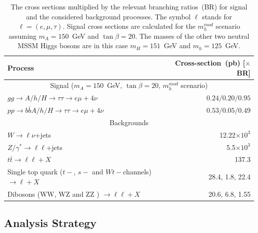 \begin{table}[tp]
\begin{center}
\begin{small}
\begin{tabular}{lr}
\hline \hline
Process                                                                 & Cross-section~(pb) [$\times$ BR] \\ [1pt]
\hline
\multicolumn{2}{c}{Signal ($m_A=150$~GeV, $\tan\beta=20$, $m_{h}^{mod}$ scenario) }  \\ [1pt]

$gg\rightarrow A/h/H \rightarrow\tau\tau \rightarrow e\mu+ 4\nu$                 &  $0.24 /0.20 / 0.95 $ \\
$pp \rightarrow b\bar{b}A/h/H \rightarrow \tau\tau \rightarrow e\mu + 4\nu$       & $0.53 /0.05 / 0.49   $ \\[1pt]
\hline
\multicolumn{2}{c}{Backgrounds} \\[1pt]
$W\rightarrow \ell \nu$+jets                           & 12.22$\times 10^3$ \\
$Z/\gamma^{*}\rightarrow \ell\ell$+jets       & 5.5$\times 10^3$ \\
$t\bar{t} \rightarrow \ell \ell + X$                                                              & 137.3 \\
Single top quark ($t-$, $s-$ and $Wt-$channels) $\rightarrow \ell + X$               & 28.4, 1.8, 22.4 \\
Dibosons (WW, WZ and ZZ ) $\rightarrow \ell \ell+ X$                                          & 20.6, 6.8, 1.55 \\ [1pt]
\hline 
\hline
\end{tabular}
\end{small}
\caption{The cross sections multiplied by the relevant branching ratios~(BR) for signal and the considered
background processes. The symbol $\ell$ stands for $\ell= (e, \mu, \tau)$. 
Signal cross sections are calculated for the $m_{h}^{mod}$ scenario assuming
 $m_A=150$~GeV and $\tan\beta=20$. The masses of the other two neutral MSSM Higgs bosons are 
	in this case  $m_H=151$~GeV and $m_h=125$~GeV.}
 \label{tab:MCxsec}

\end{center}
\end{table}


\subsection{Analysis Strategy} \label{sec:strategy}


